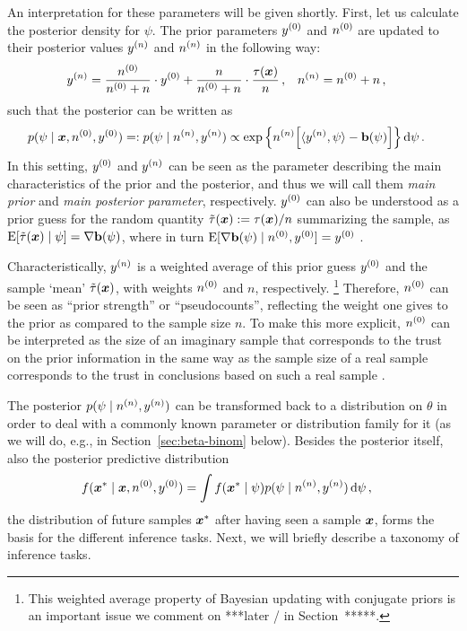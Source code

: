 An interpretation for these parameters will be given shortly.
First, let us calculate the posterior density for $\psi$.
The prior parameters $y^{(0)}$ and $n^{(0)}$ are updated to their posterior values $y^{(n)}$ and $n^{(n)}$ in the following way:
\begin{align}\label{eq:canonicalupdate}
y^{(n)} &= \frac{n^{(0)}}{n^{(0)} + n} \cdot y^{(0)} + \frac{n}{n^{(0)} + n} \cdot \frac{\tau({\bm x})}{n}\,, &
n^{(n)} &= n^{(0)} + n\,,
\end{align}
such that the posterior can be written as
\begin{align}\label{eq:canonicalposterior}
p(\psi \mid {\bm x}, n^{(0)}, y^{(0)})
 =: p(\psi \mid n^{(n)}, y^{(n)})
 &\propto \exp\Big\{ n^{(n)} \Big[ \langle y^{(n)}, \psi \rangle - \mathbf{b}(\psi) \Big] \Big\} \,\mathrm{d}\psi\,.
\end{align}
In this setting, $y^{(0)}$ and $y^{(n)}$ can be seen as the parameter describing the main characteristics of the prior and the posterior,
and thus we will call them \emph{main prior} and \emph{main posterior parameter}, respectively.
$y^{(0)}$ can also be understood as a prior guess for the random quantity $\tilde{\tau}({\bm x}) := \tau({\bm x})/n$ summarizing the sample,
as $\operatorname{E}[\tilde{\tau}({\bm x}) \mid \psi] = \nabla\mathbf{b}(\psi)$,
where in turn $\operatorname{E}[\nabla\mathbf{b}(\psi) \mid n^{(0)}, y^{(0)}] = y^{(0)}$ \parencite[e.g.,][Prop.~5.7, p.~275]{2000:bernardosmith}.

Characteristically, $y^{(n)}$ is a weighted average of this prior guess $y^{(0)}$ and the sample `mean' $\tilde{\tau}({\bm x})$,
with weights $n^{(0)}$ and $n$, respectively.%
\footnote{This weighted average property of Bayesian updating with conjugate priors is an important issue
we comment on ***later / in Section~*****.}
Therefore, $n^{(0)}$ can be seen as ``prior strength'' or ``pseudocounts'',
reflecting the weight one gives to the prior as compared to the sample size $n$.
To make this more explicit, $n^{(0)}$ can be interpreted as the size of an imaginary sample
that corresponds to the trust on the prior information in the same way
as the sample size of a real sample
corresponds to the trust in conclusions based on such a real sample \parencite[p.~258]{Walter2009a}.

The posterior $p(\psi \mid n^{(n)}, y^{(n)})$ can be transformed back to a distribution on $\theta$
in order to deal with a commonly known parameter or distribution family for it
(as we will do, e.g., in Section~\ref{sec:beta-binom} below).
Besides the posterior itself, also the posterior predictive distribution
\begin{align}
\label{eq:posteriorpredictive}
f({\bm x}^*\mid{\bm x}, n^{(0)}, y^{(0)}) &= \int f({\bm x}^* \mid \psi) p(\psi \mid n^{(n)}, y^{(n)}) \,\mathrm{d}\psi\,,
\end{align}
the distribution of future samples ${\bm x}^*$ after having seen a sample ${\bm x}$,
forms the basis for the different inference tasks. %
Next, we will briefly describe a taxonomy of inference tasks.


